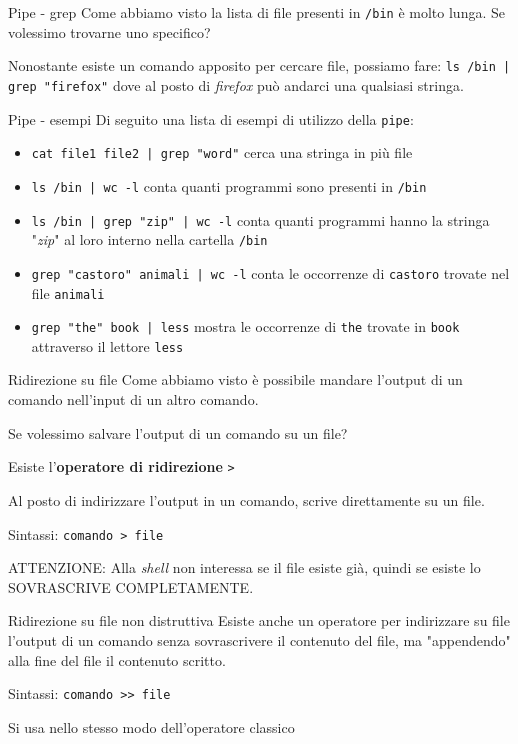 \documentclass{beamer}
\begin{document}
\begin{frame}{Pipe - grep}
  Come abbiamo visto la lista di file presenti in \texttt{/bin} è molto lunga.
  Se volessimo trovarne uno specifico?\pause \bigskip

  Nonostante esiste un comando apposito per cercare file, possiamo fare:
  \texttt{ls /bin | grep "firefox"} dove al posto di \textit{firefox} può 
  andarci una qualsiasi stringa.
\end{frame}

\begin{frame}{Pipe - esempi}
  Di seguito una lista di esempi di utilizzo della \texttt{pipe}:
  \begin{itemize}
    \item \texttt{cat file1 file2 | grep "word"} cerca una stringa in più file
    \item \texttt{ls /bin | wc -l} conta quanti programmi sono presenti in 
      \texttt{/bin}
    \item \texttt{ls /bin | grep "zip" | wc -l} conta quanti programmi hanno
      la stringa "\textit{zip}" al loro interno nella cartella \texttt{/bin}
    \item \texttt{grep "castoro" animali | wc -l} conta le occorrenze di 
      \texttt{castoro} trovate nel file \texttt{animali}
    \item \texttt{grep "the" book | less} mostra le occorrenze di \texttt{the} 
      trovate in \texttt{book} attraverso il lettore \texttt{less}
  \end{itemize}
\end{frame}

\begin{frame}{Ridirezione su file}
  Come abbiamo visto è possibile mandare l'output di un comando nell'input di
  un altro comando.\bigskip

  Se volessimo salvare l'output di un comando su un file?\pause

  Esiste l'\textbf{operatore di ridirezione} \texttt{>}\bigskip

  Al posto di indirizzare l'output in un comando, scrive direttamente su un
  file.\bigskip

  Sintassi: \texttt{comando > file}\bigskip

  ATTENZIONE: Alla \textit{shell} non interessa se il file esiste già, quindi se 
  esiste lo SOVRASCRIVE COMPLETAMENTE.
\end{frame}

\begin{frame}{Ridirezione su file non distruttiva}
  Esiste anche un operatore per indirizzare su file l'output di un comando senza 
  sovrascrivere il contenuto del file, ma "appendendo" alla fine del file il
  contenuto scritto.\bigskip

  Sintassi: \texttt{comando >> file}\bigskip

  Si usa nello stesso modo dell'operatore classico\bigskip
\end{frame}
\end{document}
